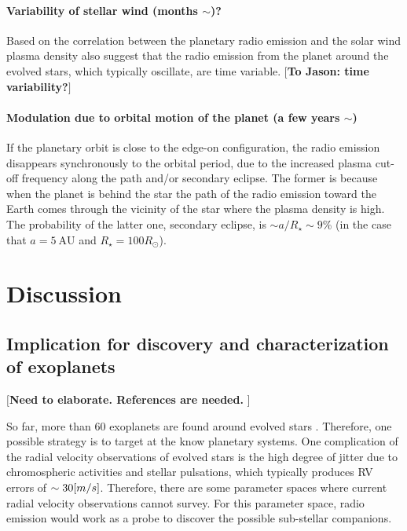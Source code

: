 \documentclass[iop,numberedappendix,apj]{emulateapj}
\def\memoYF#1{\color{red}$[${\bf #1}$]$ \color{black}}
\begin{document}
\paragraph{Variability of stellar wind (months $\sim $)?}
Based on the correlation between the planetary radio emission and the solar wind plasma density also suggest that the radio emission from the planet around the evolved stars, which typically oscillate, are time variable.
\memoYF{To Jason: time variability?}
%
\paragraph{Modulation due to orbital motion of the planet (a few years $\sim $)}
If the planetary orbit is close to the edge-on configuration, the radio emission disappears synchronously to the orbital period, due to the increased plasma cut-off frequency along the path and/or secondary eclipse.
The former is because when the planet is behind the star the path of the radio emission toward the Earth comes through the vicinity of the star where the plasma density is high.
The probability of the latter one, secondary eclipse, is $\sim a/R_\star \sim 9$\% (in the case that $a=5~\mathrm{AU}$ and $R_{\star}=100R_{\odot }$). 
%



\section{Discussion}
\label{s:discussion}


\subsection{Implication for discovery and characterization of exoplanets}
\label{ss:implication}

\memoYF{Need to elaborate. References are needed. }

So far, more than 60 exoplanets are found around evolved stars \citep[e.g.][and references therein]{trifonov2015}. 
Therefore, one possible strategy is to target at the know planetary systems.  
One complication of the radial velocity observations of evolved stars is the high degree of jitter due to chromospheric activities and stellar pulsations, which typically produces RV errors of $\sim 30 \mbox[m/s]$. 
Therefore, there are some parameter spaces where current radial velocity observations cannot survey. For this parameter space, radio emission would work as a  probe to discover the possible sub-stellar companions. 
\end{document}
